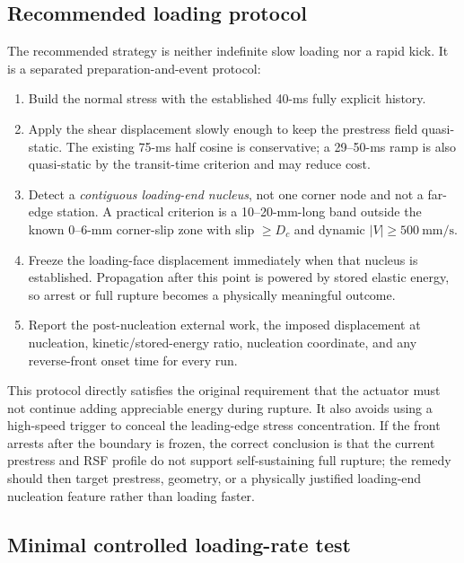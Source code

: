 \documentclass[11pt]{article}
\begin{document}
\subsection{Recommended loading protocol}

The recommended strategy is neither indefinite slow loading nor a rapid kick.
It is a separated preparation-and-event protocol:
\begin{enumerate}
  \item Build the normal stress with the established 40-ms fully explicit
  history.
  \item Apply the shear displacement slowly enough to keep the prestress field
  quasi-static.  The existing 75-ms half cosine is conservative; a 29--50-ms
  ramp is also quasi-static by the transit-time criterion and may reduce cost.
  \item Detect a \emph{contiguous loading-end nucleus}, not one corner node and
  not a far-edge station.  A practical criterion is a 10--20-mm-long band
  outside the known 0--6-mm corner-slip zone with slip $\geq D_c$ and dynamic
  $|V|\geq500\ \mathrm{mm/s}$.
  \item Freeze the loading-face displacement immediately when that nucleus is
  established.  Propagation after this point is powered by stored elastic
  energy, so arrest or full rupture becomes a physically meaningful outcome.
  \item Report the post-nucleation external work, the imposed displacement at
  nucleation, kinetic/stored-energy ratio, nucleation coordinate, and any
  reverse-front onset time for every run.
\end{enumerate}

This protocol directly satisfies the original requirement that the actuator
must not continue adding appreciable energy during rupture.  It also avoids
using a high-speed trigger to conceal the leading-edge stress concentration.
If the front arrests after the boundary is frozen, the correct conclusion is
that the current prestress and RSF profile do not support self-sustaining full
rupture; the remedy should then target prestress, geometry, or a physically
justified loading-end nucleation feature rather than loading faster.

\subsection{Minimal controlled loading-rate test}
\end{document}
